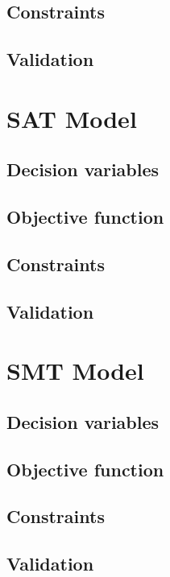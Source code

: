 \documentclass{article}
\begin{document}
\subsection{Constraints}

\subsection{Validation}

\section{SAT Model}

\subsection{Decision variables}

\subsection{Objective function}

\subsection{Constraints}

\subsection{Validation}

\section{SMT Model}

\subsection{Decision variables}

\subsection{Objective function}

\subsection{Constraints}

\subsection{Validation}
\end{document}
